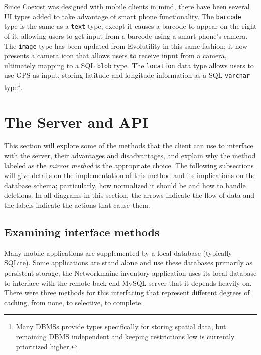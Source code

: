 \documentclass[journal]{IEEEtran}
\begin{document}
Since Coexist was designed with mobile clients in mind, there have been several UI types added to take advantage of smart phone functionality. The \texttt{barcode} type is the same as a \texttt{text} type, except it causes a barcode to appear on the right of it, allowing users to get input from a barcode using a smart phone's camera. The \texttt{image} type has been updated from Evolutility in this same fashion; it now presents a camera icon that allows users to receive input from a camera, ultimately mapping to a SQL \texttt{blob} type. The \texttt{location} data type allows users to use GPS as input, storing latitude and longitude information as a SQL \texttt{varchar} type\footnote{Many DBMSs provide types specifically for storing spatial data, but remaining DBMS independent and keeping restrictions low is currently prioritized higher.}. 






\section{The Server and API} \label{sec:api}

This section will explore some of the methods that the client can use to interface with the server, their advantages and disadvantages, and explain why the method labeled as the \textit{mirror method} is the appropriate choice. The following subsections will give details on the implementation of this method and its implications on the database schema; particularly, how normalized it should be and how to handle deletions. In all diagrams in this section, the arrows indicate the flow of data and the labels indicate the actions that cause them.

\subsection{Examining interface methods}

Many mobile applications are supplemented by a local database (typically SQLite). Some applications are stand alone and use these databases primarily as persistent storage; the Networkmaine inventory application uses its local database to interface with the remote back end MySQL server that it depends heavily on. There were three methods for this interfacing that represent different degrees of caching, from none, to selective, to complete.
\end{document}
